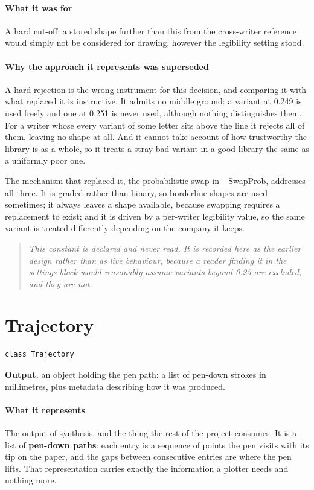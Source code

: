 \paragraph{What it was for}
A hard cut-off: a stored shape further than this from the cross-writer reference would simply not be considered for drawing, however the legibility setting stood.


\paragraph{Why the approach it represents was superseded}
A hard rejection is the wrong instrument for this decision, and comparing it with what replaced it is instructive. It admits no middle ground: a variant at 0.249 is used freely and one at 0.251 is never used, although nothing distinguishes them. For a writer whose every variant of some letter sits above the line it rejects all of them, leaving no shape at all. And it cannot take account of how trustworthy the library is as a whole, so it treats a stray bad variant in a good library the same as a uniformly poor one.

The mechanism that replaced it, the probabilistic swap in \_SwapProb, addresses all three. It is graded rather than binary, so borderline shapes are used sometimes; it always leaves a shape available, because swapping requires a replacement to exist; and it is driven by a per-writer legibility value, so the same variant is treated differently depending on the company it keeps.


\begin{quote}\small\itshape This constant is declared and never read. It is recorded here as the earlier design rather than as live behaviour, because a reader finding it in the settings block would reasonably assume variants beyond 0.25 are excluded, and they are not.\end{quote}

\section{Trajectory}
\begin{lstlisting}[style=sig]
class Trajectory
\end{lstlisting}

\noindent\textbf{Output.} an object holding the pen path: a list of pen-down strokes in millimetres, plus metadata describing how it was produced.


\paragraph{What it represents}
The output of synthesis, and the thing the rest of the project consumes. It is a list of \textbf{pen-down paths}: each entry is a sequence of points the pen visits with its tip on the paper, and the gaps between consecutive entries are where the pen lifts. That representation carries exactly the information a plotter needs and nothing more.


